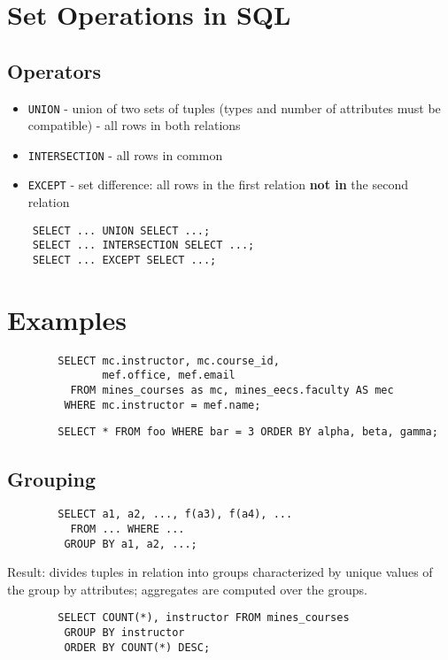\documentclass{cheatsheet}
\begin{document}
\begin{multicols*}{2}
    \section{Set Operations in SQL}
    \subsection{Operators}
    \begin{itemize}
        \item \texttt{UNION} - union of two sets of tuples (types and number of
            attributes must be compatible) - all rows in both relations
        \item \texttt{INTERSECTION} - all rows in common
        \item \texttt{EXCEPT} - set difference: all rows in the first relation
            \textbf{not in} the second relation
    \end{itemize}

    \begin{verbatim}
    SELECT ... UNION SELECT ...;
    SELECT ... INTERSECTION SELECT ...;
    SELECT ... EXCEPT SELECT ...;
    \end{verbatim}

    \section{Examples}
    \begin{verbatim}
        SELECT mc.instructor, mc.course_id,
               mef.office, mef.email
          FROM mines_courses as mc, mines_eecs.faculty AS mec
         WHERE mc.instructor = mef.name;
    \end{verbatim}

    \begin{verbatim}
        SELECT * FROM foo WHERE bar = 3 ORDER BY alpha, beta, gamma;
    \end{verbatim}

    \subsection{Grouping}
    \begin{verbatim}
        SELECT a1, a2, ..., f(a3), f(a4), ...
          FROM ... WHERE ...
         GROUP BY a1, a2, ...;
    \end{verbatim}

    Result: divides tuples in relation into groups characterized by unique values of
    the group by attributes; aggregates are computed over the groups.

    \begin{verbatim}
        SELECT COUNT(*), instructor FROM mines_courses
         GROUP BY instructor
         ORDER BY COUNT(*) DESC;
    \end{verbatim}
\end{multicols*}
\end{document}

